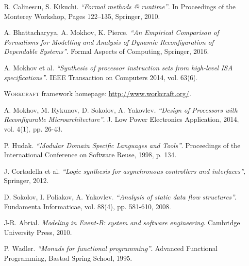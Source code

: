 \documentclass[conference]{IEEEtran}
\begin{document}
\begin{thebibliography}{12}
\vspace{-1mm}

R. Calinescu, S. Kikuchi. \emph{``Formal methods @ runtime''}. In Proceedings of the Monterey Workshop, Pages 122–135, Springer, 2010.

A. Bhattacharyya, A. Mokhov, K. Pierce. \emph{``An Empirical Comparison of Formalisms for Modelling and Analysis of Dynamic Reconfiguration of Dependable Systems''}. Formal Aspects of Computing, Springer, 2016.

A. Mokhov et al.
\emph{``Synthesis of processor instruction sets from high-level ISA specifications''}. IEEE Transaction on Computers 2014, vol. 63(6).

    \textsc{Workcraft} framework homepage: \url{http://www.workcraft.org/}.

  A. Mokhov, M. Rykunov, D. Sokolov, A. Yakovlev.
  \emph{``Design of Processors with Reconfigurable Microarchitecture''}.
  J. Low Power Electronics Application, 2014, vol. 4(1), pp. 26-43.

  P. Hudak.
  \emph{``Modular Domain Specific Languages and Tools''}.
  Proceedings of the International Conference on Software Reuse, 1998, p. 134.

J. Cortadella et al. \emph{``Logic synthesis for asynchronous controllers and interfaces''}, Springer, 2012.

  D. Sokolov, I. Poliakov, A. Yakovlev. \emph{``Analysis of static data flow structures''}. Fundamenta Informaticae, vol. 88(4), pp. 581-610, 2008.

  J-R. Abrial. \emph{Modeling in Event-B: system and software engineering}. Cambridge University Press, 2010.

  P. Wadler.
  \emph{``Monads for functional programming''}.
  Advanced Functional Programming, Bastad Spring School, 1995.




\end{thebibliography}
\end{document}
